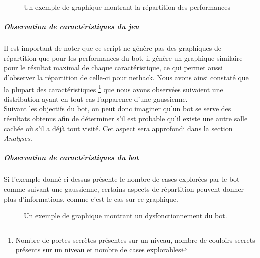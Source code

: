 \documentclass[a4paper,12pt]{article}
\begin{document}
\begin{figure}[H]
	\caption{\label{fig:impulse_graph} Un exemple de graphique montrant la
    répartition des performances}
\end{figure}

\subparagraph{Observation de caractéristiques du jeu}
Il est important de noter que ce script ne génère pas des graphiques de
répartition
que pour les performances du bot, il génère un graphique similaire pour le
résultat
maximal de chaque caractéristique, ce qui permet aussi d'observer la répartition
de celle-ci pour nethack. Nous avons ainsi constaté que la plupart des
caractéristiques \footnote{Nombre de portes secrètes présentes sur un niveau,
nombre de couloirs secrets présents sur un niveau et nombre de cases
explorables} que nous avons observées suivaient une distribution ayant en tout
cas l'apparence d'une gaussienne.
\\
Suivant les objectifs du bot, on peut donc imaginer qu'un bot se serve des
résultats obtenus afin de déterminer s'il est probable qu'il existe une autre
salle cachée où s'il a déjà tout visité. Cet aspect sera approfondi dans la
section {\em Analyses}.

\subparagraph{Observation de caractéristiques du bot}
Si l'exemple donné ci-dessus présente le nombre de cases explorées par le bot
comme suivant une gaussienne, certains aspects de répartition peuvent donner
plus d'informations, comme c'est le cas sur ce graphique.

\begin{figure}[H]
  \caption{\label{fig:nb_squares_explored} Un exemple de graphique montrant un
  dysfonctionnement du bot.}
\end{figure}
\end{document}
